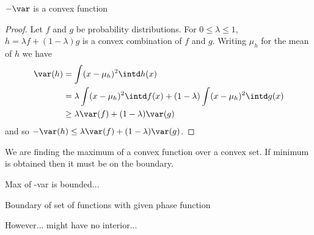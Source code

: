\begin{theorem}
	$-\var$ is a convex function
\end{theorem}
\begin{proof}
	Let $f$ and $g$ be probability distributions. For $0 \leq \lambda \leq 1$, $h = \lambda f + (1-\lambda) g$ is a convex combination of $f$ and $g$. Writing $\mu_h$ for the mean of $h$ we have
	\begin{align*}
	\var(h) &= \int (x - \mu_h)^2 \intd h(x)\\
	&= \lambda \int (x - \mu_h)^2 \intd f(x) + (1-\lambda) \int (x - \mu_h)^2 \intd g(x)\\
	&\geq \lambda \var(f) + (1-\lambda) \var(g)\\
	\end{align*}
	and so $-\var(h) \leq \lambda \var(f) + (1-\lambda) \var(g)$.
\end{proof}
We are finding the maximum of a convex function over a convex set. If minimum is obtained then it must be on the boundary.

Max of -var is bounded...

Boundary of set of functions with given phase function

However... might have no interior...
	
